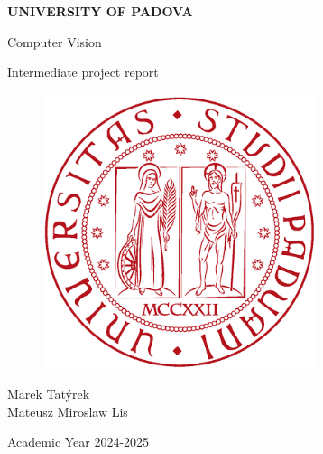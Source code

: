 \documentclass[english]{article}
\begin{document}
\begin{titlepage}

	\begin{center}
		\begin{Large} \textbf{UNIVERSITY OF PADOVA} \\
		\end{Large} \vspace{1cm}
		\vspace{3cm}
		\begin{Large} Computer Vision \end{Large}
		\par\end{center}

	\begin{center}
		\begin{Large}Intermediate project report\\
		\end{Large}
		\par\end{center}

	\begin{center}
		\vspace{2cm}
		\begin{figure}[!htb]
			\centering \includegraphics[width=8cm]{figures/unipd-logo.png}\\

		\end{figure}

		\par\end{center}

	\begin{center}
		\vspace{2cm}
		\begin{Large} Marek Tatýrek  \\
					Mateusz Miroslaw Lis \\
		\end{Large} \vspace{2cm}
		\begin{Large} Academic Year 2024-2025 \end{Large}
		\par\end{center}
		
	\end{titlepage}
	
\end{document}
